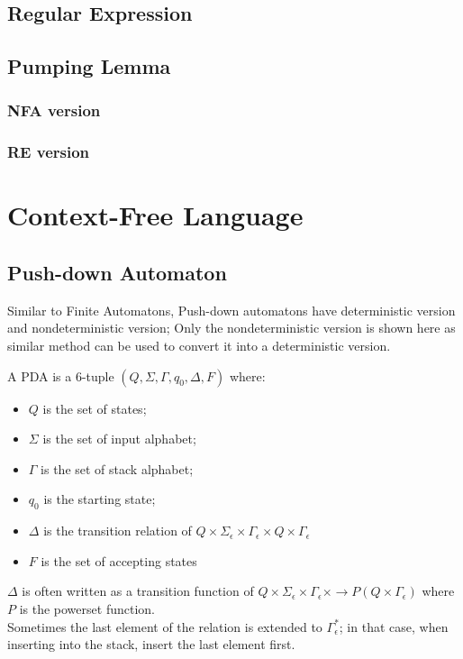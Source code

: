 \documentclass{report}
\begin{document}
		\subsection{Regular Expression}
		
		\subsection{Pumping Lemma}
			\subsubsection{NFA version}
			
			\subsubsection{RE version}
	
	\section{Context-Free Language}
		\subsection{Push-down Automaton}
			Similar to Finite Automatons, Push-down automatons have deterministic version and nondeterministic version; Only the nondeterministic version is shown here as similar method can be used to convert it into a deterministic version.
			\begin{defn} \label{def_pda}
				A PDA is a 6-tuple $(Q,\Sigma,\Gamma,q_0,\Delta,F)$ where:
				\begin{itemize}
					\item $Q$ is the set of states;
					\item $\Sigma$ is the set of input alphabet;
					\item $\Gamma$ is the set of stack alphabet;
					\item $q_0$ is the starting state;
					\item $\Delta$ is the transition relation of $Q \times \Sigma_\epsilon \times \Gamma_\epsilon \times Q \times \Gamma_\epsilon$
					\item $F$ is the set of accepting states
				\end{itemize}
				$\Delta$ is often written as a transition function of $Q \times \Sigma_\epsilon \times \Gamma_\epsilon \times \rightarrow P(Q \times \Gamma_\epsilon)$ where $P$ is the powerset function.\\
				Sometimes the last element of the relation is extended to $\Gamma_\epsilon^*$; in that case, when inserting into the stack, insert the last element first.
			\end{defn}
		
\end{document}
